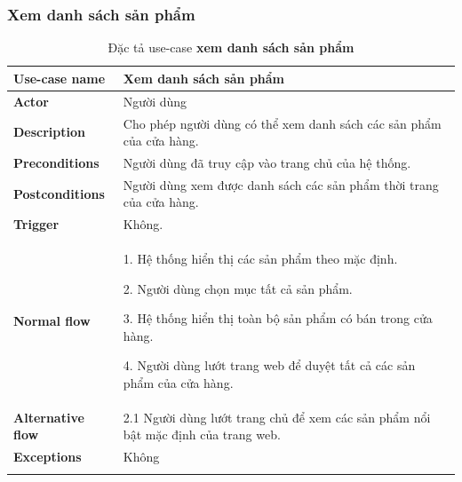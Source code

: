 \subsubsection{Xem danh sách sản phẩm}
\begin{center}
    {
        \setlength\extrarowheight{6pt}
        \begin{longtable}{| p{} | p{} |}
            \hline
            \textbf{Use-case name}
             &
            Xem danh sách sản phẩm
            \\
            \hline
            \textbf{Actor}
             &
            Người dùng
            \\
            \hline
            \textbf{Description}
             &
            Cho phép người dùng có thể xem danh sách các sản phẩm của cửa hàng.
            \\
            \hline
            \textbf{Preconditions}
             &
            Người dùng đã truy cập vào trang chủ của hệ thống.
            \\
            \hline
            \textbf{Postconditions}
             &
            Người dùng xem được danh sách các sản phẩm thời trang của cửa hàng.
            \\
            \hline
            \textbf{Trigger}
             &
            Không.
            \\
            \hline
            \textbf{Normal flow}
             &
            1. Hệ thống hiển thị các sản phẩm theo mặc định.

            2. Người dùng chọn mục tất cả sản phẩm.

            3. Hệ thống hiển thị toàn bộ sản phẩm có bán trong cửa hàng.

            4. Người dùng lướt trang web để duyệt tất cả các sản phẩm của cửa hàng.
            \\
            \hline
            \textbf{Alternative flow}
             &
            2.1 Người dùng lướt trang chủ để xem các sản phẩm nổi bật mặc định của trang web.
            \\
            \hline
            \textbf{Exceptions}
             &
            Không
            \\
            \hline
            \caption{Đặc tả use-case \textbf{xem danh sách sản phẩm}}
        \end{longtable}
    }

\end{center}


